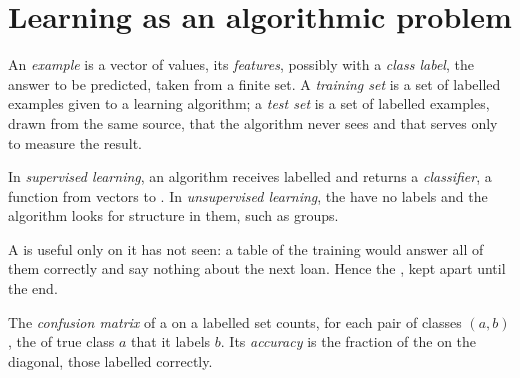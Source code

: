 \section{Learning as an algorithmic problem}\label{sec:b2:trees-and-clustering:learning}

\begin{definition}\label{def:b2:trees-and-clustering:examples}
An \emph{example} is a vector of values, its \emph{features}, possibly with a
\emph{class label}, the answer to be predicted, taken from a finite set. A \emph{training
set} is a set of labelled examples given to a learning algorithm; a \emph{test set}
is a set of labelled examples, drawn from the same source, that the algorithm never sees and that serves only to measure
the result.
\end{definition}

\begin{definition}\label{def:b2:trees-and-clustering:learning}
In \emph{supervised learning}, an algorithm receives labelled  and returns a
\emph{classifier}, a function from  vectors to . In \emph{unsupervised
learning}, the  have no labels and the algorithm looks for structure in them, such
as groups.
\end{definition}

A  is useful only on  it has not seen: a table of the training  would answer all of them
correctly and say nothing about the next loan. Hence the , kept apart until the end.

\begin{definition}\label{def:b2:trees-and-clustering:confusion}
The \emph{confusion matrix} of a  on a labelled set counts, for each pair of classes
$(a, b)$, the  of true class $a$ that it labels $b$. Its \emph{accuracy} is the fraction of the
 on the diagonal, those labelled correctly.
\end{definition}

